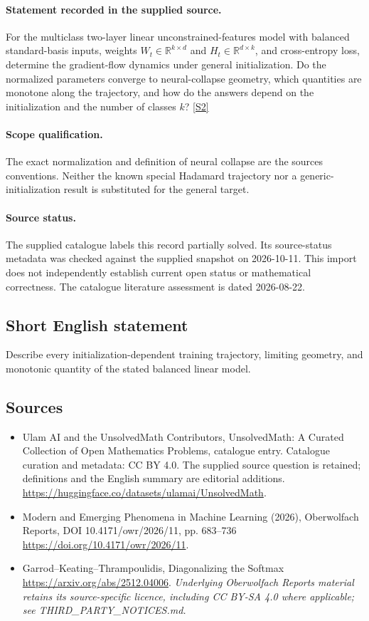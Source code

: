 \documentclass[11pt]{article}
\begin{document}
\paragraph{Statement recorded in the supplied source.}
For the multiclass two-layer linear unconstrained-features model with balanced standard-basis inputs, weights $W_t\in\mathbb R^{k\times d}$ and $H_t\in\mathbb R^{d\times k}$, and cross-entropy loss, determine the gradient-flow dynamics under general initialization. Do the normalized parameters converge to neural-collapse geometry, which quantities are monotone along the trajectory, and how do the answers depend on the initialization and the number of classes $k$? \href{https://doi.org/10.4171/owr/2026/11}{[S2]}
\paragraph{Scope qualification.}
The exact normalization and definition of neural collapse are the source\textquotesingle s conventions. Neither the known special Hadamard trajectory nor a generic-initialization result is substituted for the general target.
\paragraph{Source status.}
The supplied catalogue labels this record partially solved. Its source-status metadata was checked against the supplied snapshot on 2026-10-11. This import does not independently establish current open status or mathematical correctness. The catalogue literature assessment is dated 2026-08-22.
\subsection{Short English statement}
Describe every initialization-dependent training trajectory, limiting geometry, and monotonic quantity of the stated balanced linear model.
\subsection{Sources}
\begin{itemize}
\item[S1] Ulam AI and the UnsolvedMath Contributors, UnsolvedMath: A Curated Collection of Open Mathematics Problems, catalogue entry. Catalogue curation and metadata: CC BY 4.0. The supplied source question is retained; definitions and the English summary are editorial additions.
\url{https://huggingface.co/datasets/ulamai/UnsolvedMath}.
\item[S2] Modern and Emerging Phenomena in Machine Learning (2026), Oberwolfach Reports, DOI 10.4171/owr/2026/11, pp. 683--736
\url{https://doi.org/10.4171/owr/2026/11}.
\item[S3] Garrod--Keating--Thrampoulidis, Diagonalizing the Softmax
\url{https://arxiv.org/abs/2512.04006}.
\textit{Underlying Oberwolfach Reports material retains its source-specific licence, including CC BY-SA 4.0 where applicable; see THIRD\_PARTY\_NOTICES.md.}
\end{itemize}
\end{document}

